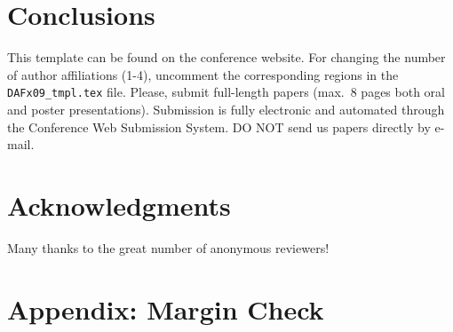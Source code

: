 \documentclass[twoside,a4paper]{article}
\begin{document}
\section{Conclusions}
This template can be found on the conference website.
For changing the number of author affiliations (1-4), uncomment the corresponding regions in the \texttt{DAFx09\_tmpl.tex} file.
Please, submit full-length papers (max.~8 pages both oral and poster presentations).
Submission is fully electronic and automated through the Conference Web Submission System.
DO NOT send us papers directly by e-mail.

\section{Acknowledgments}
Many thanks to the great number of anonymous reviewers!

\nocite{*}


\section{Appendix: Margin Check}
\end{document}
